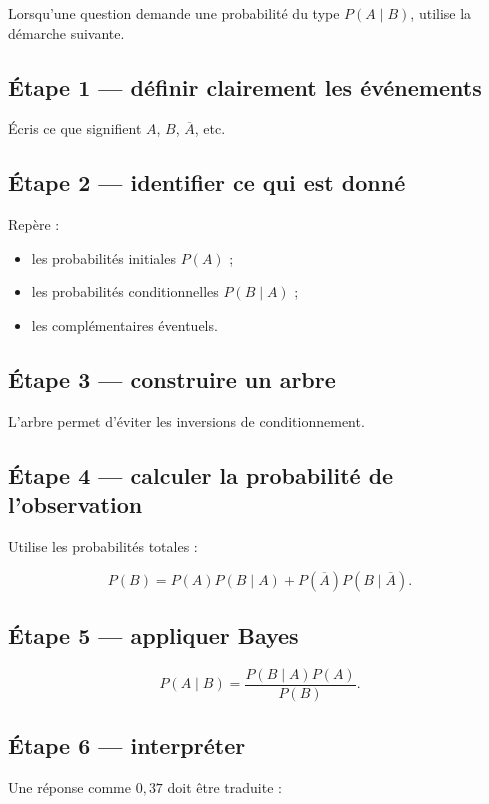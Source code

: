 {{Lorsqu'une question demande une probabilité du type $P(A\mid B)$, utilise la démarche suivante.

\subsection{Étape 1 — définir clairement les événements}

Écris ce que signifient $A$, $B$, $\overline A$, etc.

\subsection{Étape 2 — identifier ce qui est donné}

Repère :

\begin{itemize}
\item les probabilités initiales $P(A)$ ;
\item les probabilités conditionnelles $P(B\mid A)$ ;
\item les complémentaires éventuels.
\end{itemize}

\subsection{Étape 3 — construire un arbre}

L'arbre permet d'éviter les inversions de conditionnement.

\subsection{Étape 4 — calculer la probabilité de l'observation}

Utilise les probabilités totales :

\[
P(B)
=
P(A)P(B\mid A)
+
P(\overline A)P(B\mid\overline A).
\]

\subsection{Étape 5 — appliquer Bayes}

\[
P(A\mid B)
=
\frac{P(B\mid A)P(A)}{P(B)}.
\]

\subsection{Étape 6 — interpréter}

Une réponse comme $0{,}37$ doit être traduite :

}}
